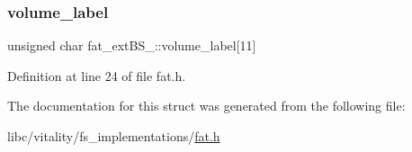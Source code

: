 \subsubsection{\texorpdfstring{volume\+\_\+label}{volume\_label}}
{\footnotesize\ttfamily unsigned char fat\+\_\+ext\+B\+S\+\_\+::volume\+\_\+label\mbox{[}11\mbox{]}}



Definition at line 24 of file fat.\+h.



The documentation for this struct was generated from the following file\+:\begin{DoxyCompactItemize}
\item 
libc/vitality/fs\+\_\+implementations/\hyperlink{a00158}{fat.\+h}\end{DoxyCompactItemize}
